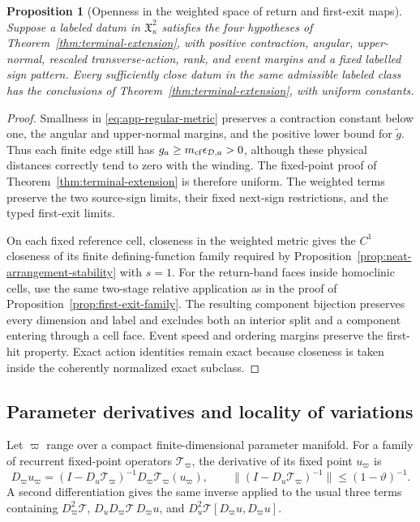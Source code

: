 \documentclass[11pt]{amsart}
\numberwithin{equation}{section}
\newtheorem{proposition}[theorem]{Proposition}
\theoremstyle{definition}
\theoremstyle{remark}
\begin{document}
\begin{proposition}[Openness in the weighted space of return and first-exit maps]
\label{prop:app-map-space-openness}
Suppose a labeled datum in $\mathfrak X_\kappa^2$ satisfies the four
hypotheses of Theorem~\ref{thm:terminal-extension}, with positive
contraction, angular, upper-normal,
rescaled transverse-action, rank, and event margins and a fixed labelled
sign pattern.  Every
sufficiently close datum in the same admissible labeled class has the conclusions of
Theorem~\ref{thm:terminal-extension}, with uniform constants.
\end{proposition}

\begin{proof}
Smallness in \eqref{eq:app-regular-metric} preserves a contraction
constant below one, the angular and upper-normal margins, and the positive
lower bound for $\widetilde g$.  Thus each finite edge still has
$g_a\ge m_{\rm cf}\epsilon_{\mathcal D,a}>0$, although these physical distances
correctly tend to zero with the winding.  The fixed-point proof of
Theorem~\ref{thm:terminal-extension} is therefore uniform.  The weighted
terms preserve the two source-sign limits, their fixed next-sign
restrictions, and the typed first-exit limits.

On each fixed reference cell, closeness in the weighted metric gives the
$C^1$ closeness of its finite defining-function family required by
Proposition~\ref{prop:neat-arrangement-stability} with $s=1$.  For the
return-band faces inside homoclinic cells, use the same two-stage relative
application as in the proof of
Proposition~\ref{prop:first-exit-family}.  The resulting component
bijection preserves every dimension and label and excludes both an
interior split and a component entering through a cell face.  Event speed
and ordering margins preserve the first-hit property.  Exact action
identities remain exact because closeness is taken inside the coherently
normalized exact subclass.
\end{proof}

\subsection{Parameter derivatives and locality of variations}

Let $\varpi$ range over a compact finite-dimensional parameter manifold.
For a family of recurrent fixed-point operators
$\mathcal T_\varpi$, the derivative of its fixed point $u_\varpi$ is
\begin{equation}\label{eq:app-first-parameter}
 D_\varpi u_\varpi=(I-D_u\mathcal T_\varpi)^{-1}
          D_\varpi\mathcal T_\varpi(u_\varpi),
\qquad
 \|(I-D_u\mathcal T_\varpi)^{-1}\|\le(1-\vartheta)^{-1}.
\end{equation}
A second differentiation gives the same inverse applied to the usual
three terms containing $D_\varpi^2\mathcal T$,
$D_uD_\varpi\mathcal T\,D_\varpi u$, and
$D_u^2\mathcal T[D_\varpi u,D_\varpi u]$.
\end{document}
